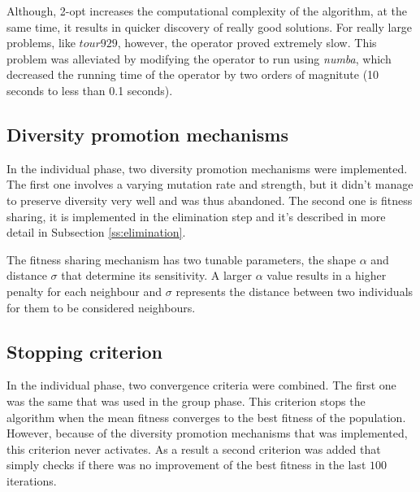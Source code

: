 \documentclass[a4paper,10pt]{article}
\newcommand{\ReplaceMe}[1]{{\color{blue}#1}}
\begin{document}
Although, 2-opt increases the computational complexity of the algorithm, at the same time, it results in quicker discovery of really good solutions. For really large problems, like $tour929$, however, the operator proved extremely slow. This problem was alleviated by modifying the operator to run using \emph{numba}, which decreased the running time of the operator by two orders of magnitute (10 seconds to less than 0.1 seconds).


\subsection{Diversity promotion mechanisms} \label{ss:diversity_promotion}


In the individual phase, two diversity promotion mechanisms were implemented. The first one involves a varying mutation rate and strength, but it didn't manage to preserve diversity very well and was thus abandoned. The second one is fitness sharing, it is implemented in the elimination step and it's described in more detail in Subsection \ref{ss:elimination}.

The fitness sharing mechanism has two tunable parameters, the shape $\alpha$ and distance $\sigma$ that determine its sensitivity. A larger $\alpha$ value results in a higher penalty for each neighbour and $\sigma$ represents the distance between two individuals for them to be considered neighbours.

\subsection{Stopping criterion} \label{ss:stopping_criterion}


In the individual phase, two convergence criteria were combined. The first one was the same that was used in the group phase. This criterion stops the algorithm when the mean fitness converges to the best fitness of the population. However, because of the diversity promotion mechanisms that was implemented, this criterion never activates. As a result a second criterion was added that simply checks if there was no improvement of the best fitness in the last $100$ iterations.
\end{document}
